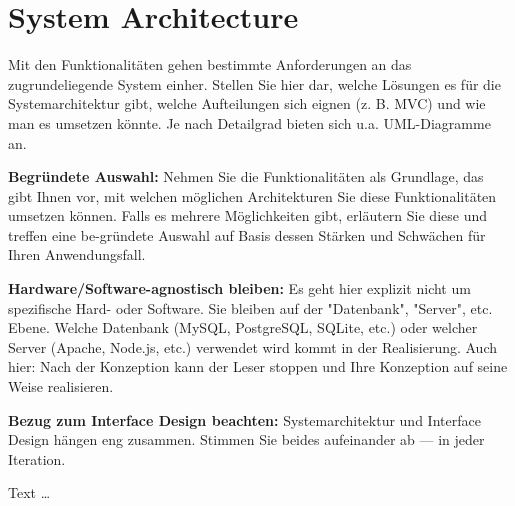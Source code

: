 \documentclass[11pt,a4paper,english]{scrreprt}
\newenvironment{comment}
  {\par\medskip
   \begingroup\color{olive}%
   }
 {\endgroup
  \medskip}
\begin{document}
\section{System Architecture}
\begin{comment}
Mit den Funktionalitäten gehen bestimmte Anforderungen an das zugrundeliegende System einher. Stellen Sie hier dar, welche Lösungen es für die Systemarchitektur gibt, welche Aufteilungen sich eignen (z. B. MVC) und wie man es umsetzen könnte. Je nach Detailgrad bieten sich u.a. UML-Diagramme an.

\textbf{Begründete Auswahl:} Nehmen Sie die Funktionalitäten als Grundlage, das gibt Ihnen vor, mit welchen möglichen Architekturen Sie diese Funktionalitäten umsetzen können. Falls es mehrere Möglichkeiten gibt, erläutern Sie diese und treffen eine be-gründete Auswahl auf Basis dessen Stärken und Schwächen für Ihren Anwendungsfall.

\textbf{Hardware/Software-agnostisch bleiben:} Es geht hier explizit nicht um spezifische Hard- oder Software. Sie bleiben auf der "Datenbank", "Server", etc. Ebene. Welche Datenbank (MySQL, PostgreSQL, SQLite, etc.) oder welcher Server (Apache, Node.js, etc.) verwendet wird kommt in der Realisierung. Auch hier: Nach der Konzeption kann der Leser stoppen und Ihre Konzeption auf seine Weise realisieren.

\textbf{Bezug zum Interface Design beachten:} Systemarchitektur und Interface Design hängen eng zusammen. Stimmen Sie beides aufeinander ab — in jeder Iteration.
\end{comment}

Text \dots
\end{document}
